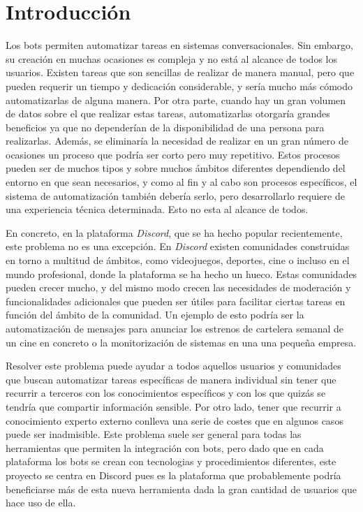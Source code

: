 \chapter{Introducción}

Los bots permiten automatizar tareas en sistemas conversacionales. Sin embargo, su creación en muchas ocasiones es compleja y no está al alcance de todos los usuarios. Existen tareas que son sencillas de realizar de manera manual, pero que pueden requerir un tiempo y dedicación considerable, y sería mucho más cómodo automatizarlas de alguna manera. Por otra parte, cuando hay un gran volumen de datos sobre el que realizar estas tareas, automatizarlas otorgaría grandes beneficios ya que no dependerían de la disponibilidad de una persona para realizarlas. Además, se eliminaría la necesidad de realizar en un gran número de ocasiones un proceso que podría ser corto pero muy repetitivo. Estos procesos pueden ser de muchos tipos y sobre muchos ámbitos diferentes dependiendo del entorno en que sean necesarios, y como al fin y al cabo son procesos específicos, el sistema de automatización también debería serlo, pero desarrollarlo requiere de una experiencia técnica determinada. Esto no esta al alcance de todos.

En concreto, en la plataforma \textit{Discord}\cite{discord}, que se ha hecho popular recientemente, este problema no es una excepción. En \textit{Discord} existen comunidades construidas en torno a multitud de ámbitos, como videojuegos, deportes, cine o incluso en el mundo profesional, donde la plataforma se ha hecho un hueco. Estas comunidades pueden crecer mucho, y del mismo modo crecen las necesidades de moderación y funcionalidades adicionales que pueden ser útiles para facilitar ciertas tareas en función del ámbito de la comunidad. Un ejemplo de esto podría ser la automatización de mensajes para anunciar los estrenos de cartelera semanal de un cine en concreto o la monitorización de sistemas en una una pequeña empresa.

Resolver este problema puede ayudar a todos aquellos usuarios y comunidades que buscan automatizar tareas específicas de manera individual sin tener que recurrir a terceros con los conocimientos específicos y con los que quizás se tendría que compartir información sensible. Por otro lado, tener que recurrir a conocimiento experto externo conlleva una serie de costes que en algunos casos puede ser inadmisible. Este problema suele ser general para todas las herramientas que permiten la integración con bots, pero dado que en cada plataforma los bots se crean con tecnologias y procedimientos diferentes, este proyecto se centra en Discord pues es la plataforma que probablemente podría beneficiarse más de esta nueva herramienta dada la gran cantidad de usuarios que hace uso de ella.


